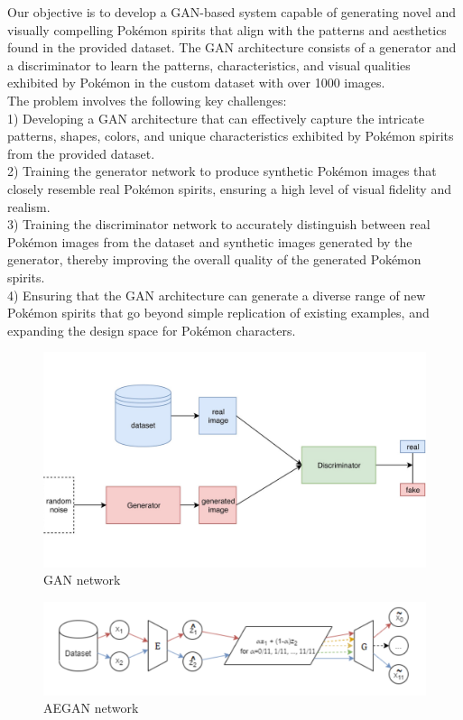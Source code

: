 \documentclass[letterpaper]{article} %
\begin{document}
Our objective is to develop a GAN-based system capable of generating novel and visually compelling Pokémon spirits that align with the patterns and aesthetics found in the provided dataset. The GAN architecture consists of a generator and a discriminator to learn the patterns, characteristics, and visual qualities exhibited by Pokémon in the custom dataset with over 1000 images. \\
The problem involves the following key challenges: \\
1) Developing a GAN architecture that can effectively capture the intricate patterns, shapes, colors, and unique characteristics exhibited by Pokémon spirits from the provided dataset. \\
2) Training the generator network to produce synthetic Pokémon images that closely resemble real Pokémon spirits, ensuring a high level of visual fidelity and realism. \\
3) Training the discriminator network to accurately distinguish between real Pokémon images from the dataset and synthetic images generated by the generator, thereby improving the overall quality of the generated Pokémon spirits. \\
4) Ensuring that the GAN architecture can generate a diverse range of new Pokémon spirits that go beyond simple replication of existing examples, and expanding the design space for Pokémon characters. 
\begin{figure}[htbp]
\captionsetup[subfigure]{justification=centering}
  \centering
  \includegraphics[scale = 0.12]{image/GAN.jpg}
  \caption{GAN network}\label{fig:GAN net}
\end{figure}

\begin{figure}[htbp]
\captionsetup[subfigure]{justification=centering}
  \centering
  \includegraphics[scale = 0.33]{image/AEGAN.png}
  \caption{AEGAN network}\label{fig:AEGAN net}
\end{figure}
\end{document}
